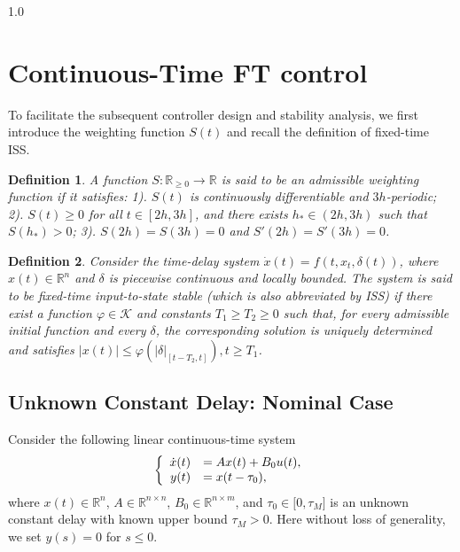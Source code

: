\documentclass[journal]{IEEEtran}
\newtheorem{definition}{Definition}
\begin{document}
\begin{spacing}{1.0}
\section{\label{sec2}Continuous-Time FT control}
To facilitate the subsequent controller design and stability analysis, we first introduce the weighting function $S(t)$ and recall the definition of fixed-time ISS.

\begin{definition}
\label{def1}\cite{Zhou21tac} A function $S:\mathbb{R}_{\geq0}\rightarrow\mathbb{R}$ is said to be an
admissible weighting function if it satisfies: 1). $S(t)$ is continuously differentiable and $3h$-periodic;
2). $S(t)\geq0$ for all $t\in[2h,3h]$, and there exists
$h_{\ast}\in(2h,3h)$ such that $S(h_{\ast})>0$;
3). $S(2h)=S(3h)=0$ and $S'(2h)=S'(3h)=0$.
\end{definition}
\begin{definition}\cite{Mazenc25tac}
\label{def2}Consider the time-delay system $\dot{x}(t)=f(t,x_{t},\delta(t))$,
where $x(t)\in\mathbb{R}^{n}$ and $\delta$ is piecewise continuous and
locally bounded. The system is said to be fixed-time input-to-state
stable (which is also abbreviated by ISS) if there exist a function $\varphi\in\mathcal{K}$ and constants
$T_{1}\geq T_{2}\geq0$ such that, for every admissible initial function
and every $\delta$, the corresponding solution is uniquely determined
and satisfies
$|x(t)|
\leq
\varphi(
|\delta|_{[t-T_{2},t]}
), t\geq T_{1}$.
\end{definition}
\subsection{Unknown Constant Delay: Nominal Case}

Consider the following linear continuous-time system
\begin{equation}
\left\{
\begin{array}
[c]{rl}%
\dot{x}(t) & =Ax(t)+B_{0}u(t),\\
y(t) & =x(t-\tau_{0}),
\end{array}
\right.  \label{sys_norm}%
\end{equation}
where $x(t)\in\mathbb{R}^{n}$, $A\in\mathbb{R}^{n\times n}$, $B_{0}%
\in\mathbb{R}^{n\times m}$, and $\tau_{0}\in\lbrack0,\tau_{M}]$ is an unknown
constant delay with known upper bound $\tau_{M}>0$. Here without loss of
generality, we set $y(s)=0$ for $s\leq0$.


\end{spacing}
\end{document}
